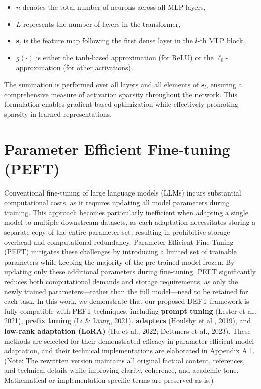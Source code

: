 \documentclass[11pt,a4paper]{article}
\begin{document}
\begin{itemize}
  \item \(n\) denotes the total number of neurons across all MLP layers,
  \item \(L\) represents the number of layers in the transformer,
  \item \(\mathbf{s}_l\) is the feature map following the first dense layer in the \(l\)-th MLP block,
  \item \(g(\cdot)\) is either the tanh-based approximation (for ReLU) or the \(\ell_0\)-approximation (for other activations).
\end{itemize}
The summation is performed over all layers and all elements of \(\mathbf{s}_l\), ensuring a comprehensive measure of activation sparsity throughout the network. This formulation enables gradient-based optimization while effectively promoting sparsity in learned representations.




\section{Parameter Efficient Fine-tuning (PEFT)}

Conventional fine-tuning of large language models (LLMs) incurs substantial computational costs, as it requires updating all model parameters during training. This approach becomes particularly inefficient when adapting a single model to multiple downstream datasets, as each adaptation necessitates storing a separate copy of the entire parameter set, resulting in prohibitive storage overhead and computational redundancy. Parameter Efficient Fine-Tuning (PEFT) mitigates these challenges by introducing a limited set of trainable parameters while keeping the majority of the pre-trained model frozen. By updating only these additional parameters during fine-tuning, PEFT significantly reduces both computational demands and storage requirements, as only the newly trained parameters—rather than the full model—need to be retained for each task. In this work, we demonstrate that our proposed DEFT framework is fully compatible with PEFT techniques, including \textbf{prompt tuning} (Lester et al., 2021), \textbf{prefix tuning} (Li \& Liang, 2021), \textbf{adapters} (Houlsby et al., 2019), and \textbf{low-rank adaptation (LoRA)} (Hu et al., 2022; Dettmers et al., 2023). These methods are selected for their demonstrated efficacy in parameter-efficient model adaptation, and their technical implementations are elaborated in Appendix A.1. (Note: The rewritten version maintains all original factual content, references, and technical details while improving clarity, coherence, and academic tone. Mathematical or implementation-specific terms are preserved as-is.)
\end{document}
